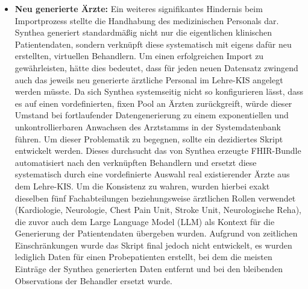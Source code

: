 \begin{description}[style=nextline, font=\bfseries]
\begin{itemize}[leftmargin=1.5em, labelsep=0.5em, itemsep=4pt, topsep=4pt]
        \item \textbf{Neu generierte Ärzte:} Ein weiteres signifikantes Hindernis beim Importprozess stellte die Handhabung des medizinischen Personals dar. Synthea generiert standardmäßig nicht nur die eigentlichen klinischen Patientendaten, sondern verknüpft diese systematisch mit eigens dafür neu erstellten, virtuellen Behandlern. Um einen erfolgreichen Import zu gewährleisten, hätte dies bedeutet, dass für jeden neuen Datensatz zwingend auch das jeweils neu generierte ärztliche Personal im Lehre-KIS angelegt werden müsste. Da sich Synthea systemseitig nicht so konfigurieren lässt, dass es auf einen vordefinierten, fixen Pool an Ärzten zurückgreift, würde dieser Umstand bei fortlaufender Datengenerierung zu einem exponentiellen und unkontrollierbaren Anwachsen des Arztstamms in der Systemdatenbank führen. Um dieser Problematik zu begegnen, sollte ein dezidiertes Skript entwickelt werden. Dieses durchsucht das von Synthea erzeugte FHIR-Bundle automatisiert nach den verknüpften Behandlern und ersetzt diese systematisch durch eine vordefinierte Auswahl real existierender Ärzte aus dem Lehre-KIS. Um die Konsistenz zu wahren, wurden hierbei exakt dieselben fünf Fachabteilungen beziehungsweise ärztlichen Rollen verwendet (Kardiologie, Neurologie, Chest Pain Unit, Stroke Unit, Neurologische Reha), die zuvor auch dem Large Language Model (LLM) als Kontext für die Generierung der Patientendaten übergeben wurden. Aufgrund von zeitlichen Einschränkungen wurde das Skript final jedoch nicht entwickelt, es wurden lediglich Daten für einen Probepatienten erstellt, bei dem die meisten Einträge der Synthea generierten Daten entfernt und bei den bleibenden Observations der Behandler ersetzt wurde. 
        

\end{itemize}
\end{description}
